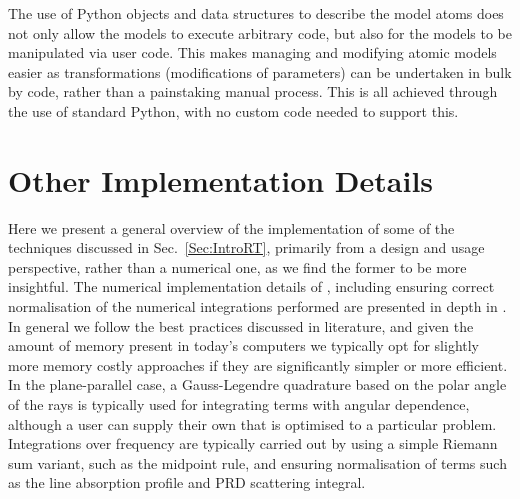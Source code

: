 The use of Python objects and data structures to describe the model atoms does not only allow the models to execute arbitrary code, but also for the models to be manipulated via user code.
This makes managing and modifying atomic models easier as transformations (modifications of parameters) can be undertaken in bulk by code, rather than a painstaking manual process.
This is all achieved through the use of standard Python, with no custom code needed to support this.


\section{Other Implementation Details}

Here we present a general overview of the implementation of some of the techniques discussed in Sec.~\ref{Sec:IntroRT}, primarily from a design and usage perspective, rather than a numerical one, as we find the former to be more insightful.
The numerical implementation details of \Lw{}, including ensuring correct normalisation of the numerical integrations performed are presented in depth in \citet{Osborne2021}.
In general we follow the best practices discussed in literature, and given the amount of memory present in today's computers we typically opt for slightly more memory costly approaches if they are significantly simpler or more efficient.
In the plane-parallel case, a Gauss-Legendre quadrature based on the polar angle of the rays is typically used for integrating terms with angular dependence, although a user can supply their own that is optimised to a particular problem.
Integrations over frequency are typically carried out by using a simple Riemann sum variant, such as the midpoint rule, and ensuring normalisation of terms such as the line absorption profile and PRD scattering integral.

